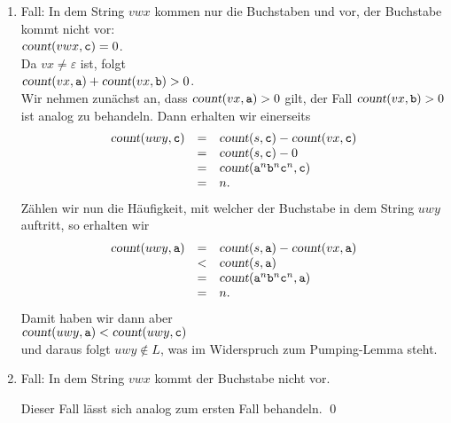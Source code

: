 \begin{enumerate}
\item Fall: In dem String $vwx$ kommen nur die Buchstaben  und  vor,  der Buchstabe
       kommt nicht vor: 
      \\[0.2cm]
      \hspace*{1.3cm}
      $\textsl{count}(vwx,\mathtt{c}) = 0$.
      \\[0.2cm]
      Da $vx \not= \varepsilon$ ist, folgt
      \\[0.2cm]
      \hspace*{1.3cm}
      $\textsl{count}(vx,\mathtt{a}) + \textsl{count}(vx,\mathtt{b}) > 0$.
      \\[0.2cm]
      Wir nehmen zun\"achst an, dass $\textsl{count}(vx,\mathtt{a}) > 0$ gilt,
      der Fall $\textsl{count}(vx,\mathtt{b}) > 0$ ist analog zu behandeln.
      Dann erhalten wir einerseits
      \[ 
      \begin{array}[t]{lcl}
        \textsl{count}(uwy,\mathtt{c}) & = & \textsl{count}(s,\mathtt{c}) - \textsl{count}(vx,\mathtt{c}) \\
                              & = & \textsl{count}(s,\mathtt{c}) - 0 \\
                              & = & \textsl{count}(\mathtt{a}^n\mathtt{b}^n\mathtt{c}^n,\mathtt{c}) \\
                              & = & n.
      \end{array}
      \]
      Z\"ahlen wir nun die H\"aufigkeit, mit welcher der Buchstabe 
      in dem String $uwy$ auftritt, so erhalten wir
      \[ 
      \begin{array}[t]{lcl}
        \textsl{count}(uwy,\mathtt{a}) & = & 
        \textsl{count}(s,\mathtt{a})  - \textsl{count}(vx,\mathtt{a}) \\
                              & < & \textsl{count}(s,\mathtt{a}) \\
                              & = & \textsl{count}(\mathtt{a}^n\mathtt{b}^n\mathtt{c}^n,\mathtt{a}) \\
                              & = & n.
      \end{array}
      \]
      Damit haben wir dann aber
      \\[0.2cm]
      \hspace*{1.3cm}
      $\textsl{count}(uwy,\mathtt{a}) < \textsl{count}(uwy,\mathtt{c})$
      \\[0.2cm]
      und daraus folgt $uwy \not\in L$, was im Widerspruch zum Pumping-Lemma steht.
\item Fall: In dem String $vwx$ kommt der Buchstabe  nicht vor.
   
      Dieser Fall l\"asst sich analog zum ersten Fall behandeln. \qed
\end{enumerate}

